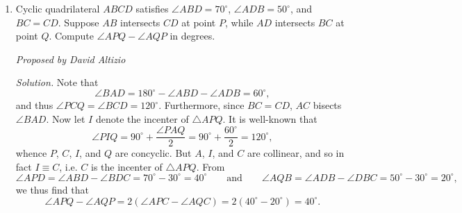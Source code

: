 \documentclass[10pt]{article}
\newcommand{\proposed}[1]
{
\vspace{5pt}
\noindent\textit{Proposed by #1}
}
\newcommand{\solution}
{
\vspace{5pt}
\noindent\textit{Solution.}\qquad
}
\begin{document}
\begin{enumerate}
\proposed{David Altizio}

\solution We first proceed with a lemma.

\par $\textbf{LEMMA: }$ If $\omega_1$ and $\omega_2$ are orthogonal circles with radii $r_1$ and $r_2$ respectively, and $d$ is the distance between the centers of these two circles, then \[r_1^2+r_2^2=d^2.\]

\par $\textit{Proof.}$ Let $P$ be a point of intersection of $\omega_1$ and $\omega_2$, and let $O_1$ and $O_2$ denote the centers of $\omega_1$ and $\omega_2$ respectively.  Note that by the definition of tangency, $PO_1$ is perpendicular to the line tangent to $\omega_1$ at $P$.  But recall that by the definition of orthogonal circles, the tangents to $\omega_1$ and $\omega_2$ passing through $P$ are perpendicular.  Hence $PO_1\perp PO_2$, and the desired follows from Pythagorean Theorem.  $\blacksquare$

\par Let $r_B$ and $r_C$ denote the radii of $\omega_B$ and $\omega_C$ respectively.  Note that by Pythagorean Theorem, \[AT_B^2 = AB^2 - r_B^2\qquad\text{and}\qquad AT_C^2 = AC^2-r_C^2.\] Adding these together yields \begin{align*} AT_B^2+AT_C^2 &= AB^2 + AC^2 - (r_B^2 + r_C^2) \\&= AB^2 + AC^2 - BC^2 = 2(AB)(AC)\cos\angle BAC,\end{align*} where the last step follows from Law of Cosines.  Combined with $\tfrac12(AB)(AC)\sin\angle BAC = [ABC]$, it follows that \[\tan\angle BAC = \dfrac{\sin\angle BAC}{\cos\angle BAC} = \dfrac{(AB)(AC)\sin\angle BAC}{(AB)(AC)\cos\angle BAC} = \dfrac{4[ABC]}{AT_B^2+AT_C^2} = \dfrac{4\cdot 20}{7^2+11^2} = \boxed{\dfrac{8}{17}}.\]

\item Cyclic quadrilateral $ABCD$ satisfies $\angle ABD = 70^\circ$, $\angle ADB=50^\circ$, and $BC=CD$.  Suppose $AB$ intersects $CD$ at point $P$, while $AD$ intersects $BC$ at point $Q$.  Compute $\angle APQ-\angle AQP$ in degrees.

\proposed{David Altizio}

\solution Note that \[\angle BAD = 180^\circ-\angle ABD-\angle ADB = 60^\circ,\] and thus $\angle PCQ=\angle BCD=120^\circ$.  Furthermore, since $BC=CD$, $AC$ bisects $\angle BAD$.  Now let $I$ denote the incenter of $\triangle APQ$.  It is well-known that \[\angle PIQ = 90^\circ+\dfrac{\angle PAQ}2 = 90^\circ+\dfrac{60^\circ}2 = 120^\circ,\] whence $P$, $C$, $I$, and $Q$ are concyclic.  But $A$, $I$, and $C$ are collinear, and so in fact $I\equiv C$, i.e. $C$ is the incenter of $\triangle APQ$.  From \[\angle APD = \angle ABD-\angle BDC = 70^\circ-30^\circ = 40^\circ\qquad\text{and}\qquad \angle AQB = \angle ADB-\angle DBC = 50^\circ-30^\circ=20^\circ,\] we thus find that \[\angle APQ-\angle AQP = 2(\angle APC-\angle AQC) = 2(40^\circ-20^\circ)=\boxed{40^\circ}.\]


\end{enumerate}
\end{document}
